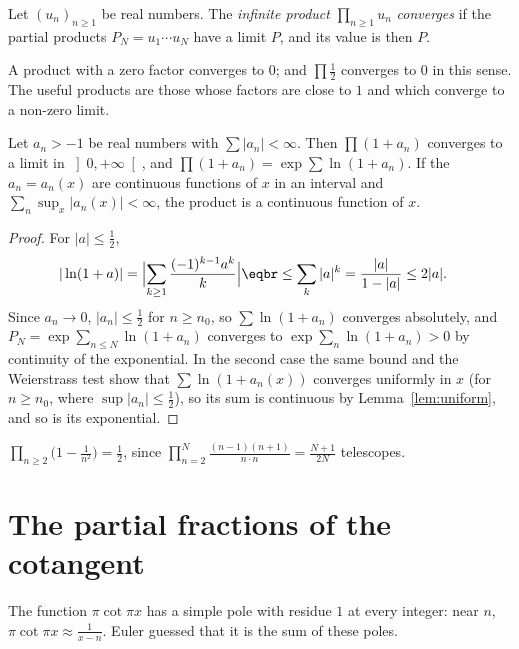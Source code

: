\begin{definition}
Let $(u_n)_{n\ge1}$ be real numbers. The \emph{infinite product} $\prod_{n\ge1}u_n$ \emph{converges} if the partial products
$P_N=u_1\cdots u_N$ have a limit $P$, and its value is then $P$.
\end{definition}

A product with a zero factor converges to $0$; and $\prod\frac12$ converges to $0$ in this sense. The useful products
are those whose factors are close to $1$ and which converge to a non-zero limit.

\begin{proposition}\label{prop:products}
Let $a_n>-1$ be real numbers with $\sum|a_n|<\infty$. Then $\prod(1+a_n)$ converges to a limit in $\left]0,+\infty\right[$, and
$\prod(1+a_n)=\exp\sum\ln(1+a_n)$. If the $a_n=a_n(x)$ are continuous functions of $x$ in an interval and
$\sum_n\sup_x|a_n(x)|<\infty$, the product is a continuous function of $x$.
\end{proposition}
\begin{proof}
For $|a|\le\frac12$,
\[
\begin{aligned}|\ln(1+a)|&=\Bigl|\sum_{k\ge1}\frac{(-1)^{k-1}a^k}k\Bigr|\eqbr\le\sum_k|a|^k=\frac{|a|}{1-|a|}\le2|a|.\end{aligned}
\]
Since $a_n\to0$,
$|a_n|\le\frac12$ for $n\ge n_0$, so $\sum\ln(1+a_n)$ converges absolutely, and $P_N=\exp\sum_{n\le N}\ln(1+a_n)$ converges to
$\exp\sum_n\ln(1+a_n)>0$ by continuity of the exponential. In the second case the same bound and the Weierstrass test show that
$\sum\ln(1+a_n(x))$ converges uniformly in $x$ (for $n\ge n_0$, where $\sup|a_n|\le\frac12$), so its sum is continuous by
Lemma~\ref{lem:uniform}, and so is its exponential.
\end{proof}

\begin{example}
$\prod_{n\ge2}\bigl(1-\frac1{n^2}\bigr)=\frac12$, since $\prod_{n=2}^N\frac{(n-1)(n+1)}{n\cdot n}=\frac{N+1}{2N}$ telescopes.
\end{example}

\section{The partial fractions of the cotangent}

The function $\pi\cot\pi x$ has a simple pole with residue $1$ at every integer: near $n$, $\pi\cot\pi x\approx\frac1{x-n}$.
Euler guessed that it is the sum of these poles.

